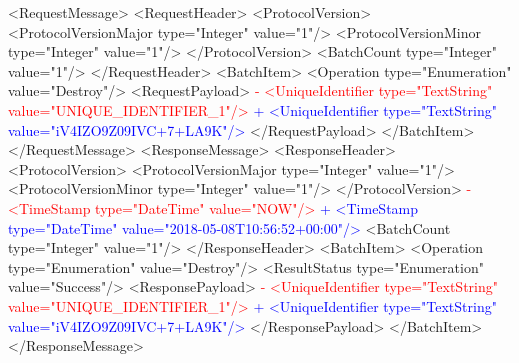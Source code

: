  \newpage
 <RequestMessage>
   <RequestHeader>
     <ProtocolVersion>
       <ProtocolVersionMajor type="Integer" value="1"/>
       <ProtocolVersionMinor type="Integer" value="1"/>
     </ProtocolVersion>
     <BatchCount type="Integer" value="1"/>
   </RequestHeader>
   <BatchItem>
     <Operation type="Enumeration" value="Destroy"/>
     <RequestPayload>
\textcolor{red}{-      <UniqueIdentifier type="TextString" value="UNIQUE_IDENTIFIER_1"/>}
\textcolor{blue}{+      <UniqueIdentifier type="TextString" value="iV4IZO9Z09IVC+7+LA9K"/>}
     </RequestPayload>
   </BatchItem>
 </RequestMessage>
 <ResponseMessage>
   <ResponseHeader>
     <ProtocolVersion>
       <ProtocolVersionMajor type="Integer" value="1"/>
       <ProtocolVersionMinor type="Integer" value="1"/>
     </ProtocolVersion>
\textcolor{red}{-    <TimeStamp type="DateTime" value="NOW"/>}
\textcolor{blue}{+    <TimeStamp type="DateTime" value="2018-05-08T10:56:52+00:00"/>}
     <BatchCount type="Integer" value="1"/>
   </ResponseHeader>
   <BatchItem>
     <Operation type="Enumeration" value="Destroy"/>
     <ResultStatus type="Enumeration" value="Success"/>
     <ResponsePayload>
\textcolor{red}{-      <UniqueIdentifier type="TextString" value="UNIQUE_IDENTIFIER_1"/>}
\textcolor{blue}{+      <UniqueIdentifier type="TextString" value="iV4IZO9Z09IVC+7+LA9K"/>}
     </ResponsePayload>
   </BatchItem>
 </ResponseMessage>
 
 \newpage
